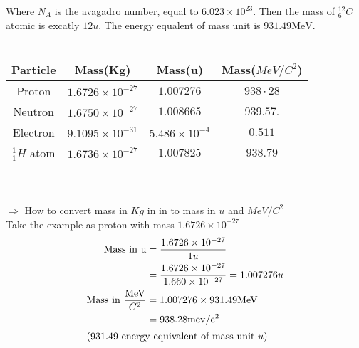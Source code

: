 Where $N_A$ is the avagadro number, equal to $6.023 \times 10^{23}$. Then the mass of $^{12}_6C$ atomic is excatly $12 u$. The energy equalent of mass unit is $931.49 \mathrm{MeV} .$\\\\
\begin{tabular}{c|c|c|c|}
	\hline
	Particle & Mass(Kg) & Mass(u) & Mass($Me V/C^2$)\\
	\hline
	Proton & $1.6726 \times 10^{-27}$ & $1.007276$ & $938 \cdot 28$\\
	\hline
	Neutron & $1.6750 \times10^{-27}$ & $1.008665$ & $939.57 .$\\
	\hline
	Electron & $9.1095 \times 10^{-31}$ & $5.486 \times 10^{-4}$ & $0.511$\\
	\hline
	$^1_1 H$ atom & $1.6736 \times 10^{-27}$ & $1.007825$ & $938.79$\\
	\hline
\end{tabular}\\\\
$\Rightarrow$ How to convert mass in $Kg$ in in to mass in $u$ and $MeV/C^2$\\
Take the example as proton with mass $1.6726 \times 10^{-27}$ 
\begin{align*}
\text{Mass in u}&=\frac{1.6726 \times 10^{-27}}{1u}\\
&=\frac{1.6726 \times 10^{-27}}{1.660 \times 10^{-27}}=1.007276u\\
\text{Mass in}\  \frac{\mathrm{MeV}}{C^2} &=1.007276 \times 931.49 \mathrm{MeV}\\
&=938.28 \mathrm{mev} / \mathrm{c}^{2} \\
\intertext{$(931.49$ energy equivalent of mass unit $u$)}
\end{align*}
